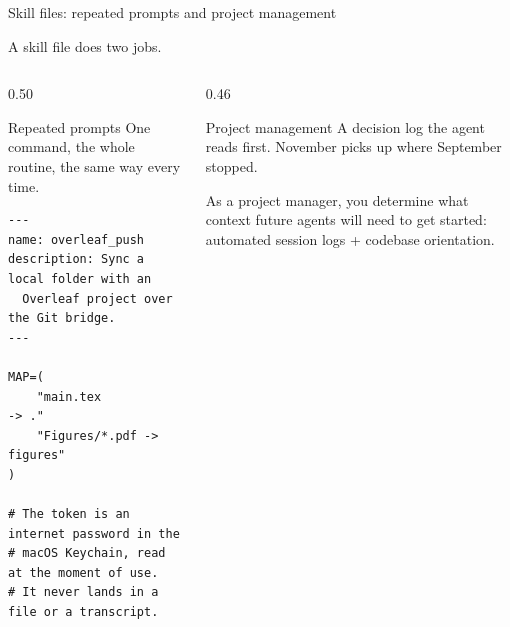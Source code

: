 \documentclass[aspectratio=169,11pt]{beamer}
\begin{document}
\begin{frame}[fragile]{Skill files: repeated prompts and project management}

{\small A skill file does two jobs.}

\vspace{0.4em}
\begin{columns}[T]
\begin{column}{0.50\textwidth}
\begin{block}{\small Repeated prompts}
{\scriptsize One command, the whole routine, the same way every time.}
\end{block}
\begin{Verbatim}[fontsize=\scriptsize,frame=single,rulecolor=\color{darkgray}]
---
name: overleaf_push
description: Sync a local folder with an
  Overleaf project over the Git bridge.
---

MAP=(
    "main.tex               -> ."
    "Figures/*.pdf -> figures"
)

# The token is an internet password in the
# macOS Keychain, read at the moment of use.
# It never lands in a file or a transcript.
\end{Verbatim}
\end{column}
\begin{column}{0.46\textwidth}
\begin{block}{\small Project management}
{\scriptsize A decision log the agent reads first. November picks up where September
stopped.}
\end{block}

\vspace{0.4em}
{\small As a project manager, you determine what context future agents will need to get started: automated session logs + codebase orientation.}
\end{column}
\end{columns}
\end{frame}
\end{document}

